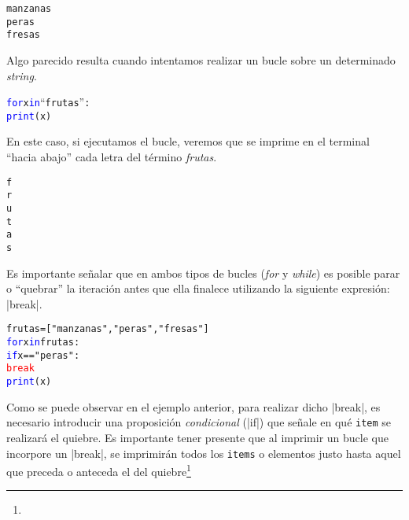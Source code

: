 \documentclass{article}
\begin{document}
\begin{enumerate}
\begin{itemize}
\begin{tcolorbox}
\begin{alltt}
manzanas
peras
fresas
\end{alltt}        
\end{tcolorbox}
\vspace{0.5cm}
\par \hspace{5pt} Algo parecido resulta cuando intentamos realizar un bucle sobre un determinado \emph{string}.
\begin{tcolorbox}
\begin{alltt}
\textcolor{blue}{for} x \textcolor{blue}{in} ``frutas'':
    \textcolor{blue}{print}(x)
\end{alltt}        
\end{tcolorbox}
\par \hspace{5pt} En este caso, si ejecutamos el bucle, veremos que se imprime en el terminal ``hacia abajo'' cada letra del término \emph{frutas}.
\begin{tcolorbox}
\begin{alltt}
f
r
u
t
a
s
\end{alltt}        
\end{tcolorbox}
\vspace{0.25cm}
\end{itemize}
\par \hspace{5pt} Es importante señalar que en ambos tipos de bucles (\emph{for} y \emph{while}) es posible parar o ``quebrar'' la iteración antes que ella finalece utilizando la siguiente expresión: \rverb|break|.
\begin{tcolorbox}
\begin{alltt}
frutas = ["manzanas", "peras", "fresas"]
\textcolor{blue}{for} x \textcolor{blue}{in} frutas:
  \textcolor{blue}{if} x == "peras":
    \textcolor{red}{break}
  \textcolor{blue}{print}(x) 
\end{alltt}        
\end{tcolorbox}
\par \hspace{5pt} Como se puede observar en el ejemplo anterior, para realizar dicho \rverb|break|, es necesario introducir una proposición \emph{condicional} (\bverb|if|) que señale en qué \verb|item| se realizará el quiebre. Es importante tener presente que al imprimir un bucle que incorpore un \rverb|break|, se imprimirán todos los \verb|items| o elementos justo hasta aquel que preceda o anteceda el del quiebre\footnote{
}
\end{enumerate}
\end{document}
